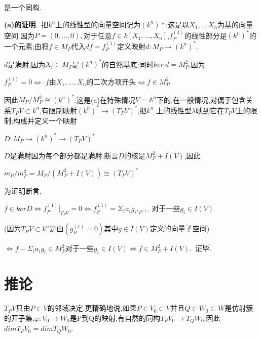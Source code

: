 \documentclass[UTF8]{book}
\begin{document}
是一个同构.


\textbf{(a)的证明}.\ 把$k^{n}$上的线性型的向量空间记为$(k^{n})*$;这是以$X_{1},..,X_{n}$为基的向量空间.因为$ P=(0,...,0), $对于任意$f\in k[X_{1},...,X_{n}]$,$f_{P}^{(1)}$的线性部分是$(k^{n})^{*}$的一个元素;由将$f\in M_{P}$代入$df = f_{P}^{(1)}$定义映射$d:M_{P}\rightarrow (k^{n})^{*}$.


$ d $是满射,因为$X_{i}\in M_{P}$是$(k^{n})^{*}$的自然基底;同时$ker\ d = M_{P}^{2}$,因为


\begin{center}
	$f_{P}^{(1)}=0\Longleftrightarrow$ $ f $由$X_{1},...,X_{n}$的二次方项开头$\Longleftrightarrow f\in M_{P}^{2}$
\end{center}


因此$M_{P}/M_{P}^{2}\cong(k^{n})^{*}$.这是(a)在特殊情况$V=\mathbb{A}^{n}$下的.在一般情况,对偶于包含关系$T_{P}V\subset k^{n}$,有限制映射$(k^{n})^{*}\rightarrow (T_{P}V)^{*}$,把$k^{n}$ 上的线性型$\lambda$映到它在$T_{P}V$上的限制;构成并定义一个映射


\begin{center}
	$D:M_{P}\rightarrow (k^{n})^{*}\rightarrow (T_{P}V)^{*}$
\end{center}


$ D $是满射因为每个部分都是满射.断言$ D $的核是$M_{P}^{2} + I(V)$,因此


\begin{center}
	$m_{P}/m_{P}^{2} = M_{P}/(M_{P}^{2} + I(V)) \cong (T_{P}V)^{*}$
\end{center}


为证明断言,


\begin{center}
	$f\in ker D \Leftrightarrow f_{P}^{(1)}|_{T_{P}V} = 0 \Leftrightarrow f_{P}^{(1)} = \Sigma_{i}a_{i}g_{i},_{P^{(1)}}$对于一些$g_{i}\in I(V)$
	
	
	(因为$T_{P}V\subset k^{n}$是由$(g_{P}^{(1)} = 0)$其中$g\in I(V)$定义的向量子空间)
	
	
	$\Leftrightarrow f - \Sigma_{i}a_{i}g_{i}\in M_{P}^{2}$对于一些$g_{i}\in I(V)\Leftrightarrow f\in M_{P}^{2} + I(V)$.\ 证毕.
\end{center}


\section{推论}
$T_{P}V$只由$P\in V$的邻域决定.更精确地说,如果$P\in V_{0}\subset V$并且$Q\in W_{0}\subset W$是仿射簇的开子集,$\varphi:V_{0}\rightarrow W_{0}$是P到Q的映射,有自然的同构$T_{P}V_{0}\rightarrow T_{Q}W_{0}$;因此$dim T_{P}V_{0} = dim T_{Q}W_{0}$.
\end{document}
